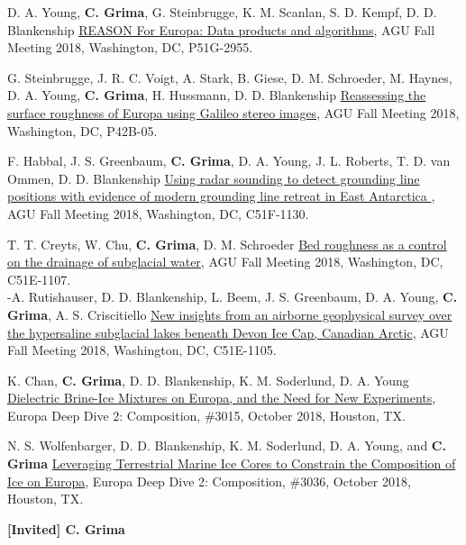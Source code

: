 \begin{etaremune}
\item
  D. A. Young, \textbf{C. Grima}, G. Steinbrugge, K. M. Scanlan, S. D.
  Kempf, D. D. Blankenship
  \href{https://agu.confex.com/agu/fm18/meetingapp.cgi/Paper/466083}{REASON
  For Europa: Data products and algorithms}, AGU Fall Meeting 2018,
  Washington, DC, P51G-2955.
\item
  G. Steinbrugge, J. R. C. Voigt, A. Stark, B. Giese, D. M. Schroeder,
  M. Haynes, D. A. Young, \textbf{C. Grima}, H. Hussmann, D. D.
  Blankenship
  \href{https://agu.confex.com/agu/fm18/meetingapp.cgi/Paper/381734}{Reassessing
  the surface roughness of Europa using Galileo stereo images}, AGU Fall
  Meeting 2018, Washington, DC, P42B-05.
\item
  F. Habbal, J. S. Greenbaum, \textbf{C. Grima}, D. A. Young, J. L.
  Roberts, T. D. van Ommen, D. D. Blankenship
  \href{https://agu.confex.com/agu/fm18/meetingapp.cgi/Paper/454958}{
  Using radar sounding to detect grounding line positions with evidence
  of modern grounding line retreat in East Antarctica }, AGU Fall
  Meeting 2018, Washington, DC, C51F-1130.
\item
  T. T. Creyts, W. Chu, \textbf{C. Grima}, D. M. Schroeder
  \href{https://agu.confex.com/agu/fm18/meetingapp.cgi/Paper/457826}{Bed
  roughness as a control on the drainage of subglacial water}, AGU Fall
  Meeting 2018, Washington, DC, C51E-1107.\\
  -A. Rutishauser, D. D. Blankenship, L. Beem, J. S. Greenbaum, D. A.
  Young, \textbf{C. Grima}, A. S. Criscitiello
  \href{https://agu.confex.com/agu/fm18/meetingapp.cgi/Paper/465144}{
  New insights from an airborne geophysical survey over the hypersaline
  subglacial lakes beneath Devon Ice Cap, Canadian Arctic}, AGU Fall
  Meeting 2018, Washington, DC, C51E-1105.
\item
  K. Chan, \textbf{C. Grima}, D. D. Blankenship, K. M. Soderlund, D. A.
  Young
  \href{https://www.hou.usra.edu/meetings/europadeepdive2018/pdf/3015.pdf}{Dielectric
  Brine-Ice Mixtures on Europa, and the Need for New Experiments},
  Europa Deep Dive 2: Composition, \#3015, October 2018, Houston, TX.
\item
  N. S. Wolfenbarger, D. D. Blankenship, K. M. Soderlund, D. A. Young,
  and \textbf{C. Grima}
  \href{https://www.hou.usra.edu/meetings/europadeepdive2018/pdf/3036.pdf}{Leveraging
  Terrestrial Marine Ice Cores to Constrain the Composition of Ice on
  Europa}, Europa Deep Dive 2: Composition, \#3036, October 2018,
  Houston, TX.
\item
  \textbf{{[}Invited{]} C. Grima}

\end{etaremune}
